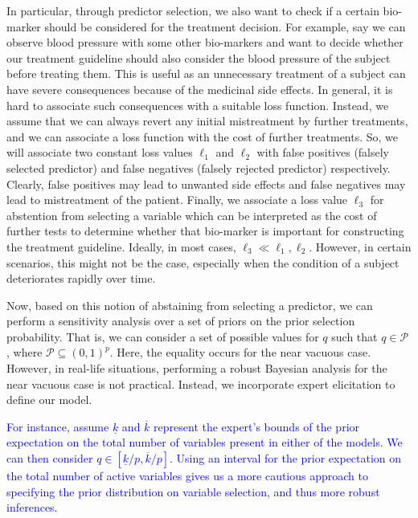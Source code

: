 \documentclass[preprint,12pt]{elsarticle}
\newcommand{\added}[1]{\textcolor{blue}{#1}}
\begin{document}
In particular, through predictor selection, we also want 
to check if a certain bio-marker should be considered
for the treatment decision. For example, say we can observe blood pressure with some
other bio-markers and want to decide whether our
treatment guideline should also consider the blood
pressure of the subject before treating them. This is
useful as an unnecessary treatment of a subject can have severe consequences because of the medicinal
side effects. In general, it is hard to associate such consequences 
with a suitable loss function. Instead, we
assume that we can always revert any initial mistreatment by further treatments, 
and we can associate a loss function with the cost of further treatments.
So, we will associate two constant loss values $\ell_1$ and $\ell_2$ 
with false positives (falsely selected predictor) and 
false negatives (falsely rejected predictor) respectively. 
Clearly, false positives may lead to unwanted side effects and
false negatives may lead to mistreatment of the patient. Finally, we associate
a loss value $\ell_3$ for abstention from selecting
a variable which can be interpreted as the cost of further tests to determine whether that bio-marker
is important for constructing the treatment guideline.
Ideally, in most cases, $\ell_3\ll \ell_1,\ell_2$. However, in certain scenarios,
this might not be the case, especially when the condition of a subject deteriorates rapidly
over time.

Now, based on this notion of abstaining from selecting a predictor, we can perform
a sensitivity analysis over a set of priors on the prior selection probability.
That is, we can consider a set of possible values for $q$ such that
$q\in\mathcal{P}$, where $\mathcal{P} \subseteq \left(0, 1\right)^{p}$.
Here, the equality occurs for the near vacuous case. However, in real-life
situations, performing a robust Bayesian analysis for the near vacuous case is 
not practical. Instead, we incorporate expert elicitation to define our model.

\added{%
For instance, assume $\underline{k}$ and $\overline{k}$ represent the expert's bounds of the prior expectation on the
total number of variables present in either of the models. We can then consider $q\in \left[\underline{k}/p, \overline{k}/p\right]$.
Using an interval for the prior expectation on the total number of active variables
gives us a more cautious approach to specifying the prior distribution on variable selection,
and thus more robust inferences.%
}
\end{document}
